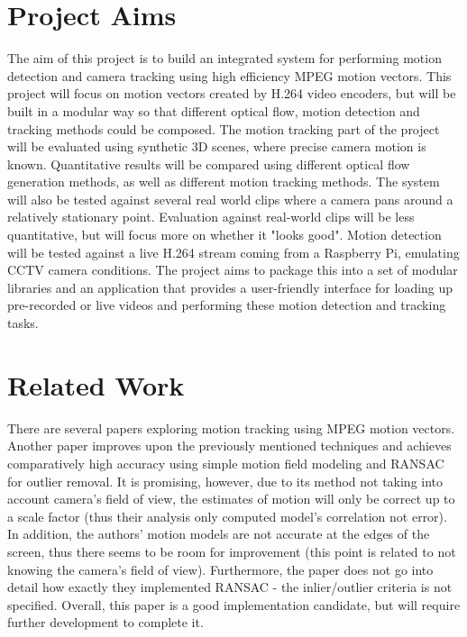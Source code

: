 \documentclass[11pt,english]{report}
\begin{document}
\section{Project Aims}

The aim of this project is to build an integrated system for performing motion detection and camera tracking using high efficiency MPEG motion vectors. This project will focus on motion vectors created by H.264 video encoders, but will be built in a modular way so that different optical flow, motion detection and tracking methods could be composed. The motion tracking part of the project will be evaluated using synthetic 3D scenes, where precise camera motion is known. Quantitative results will be compared using different optical flow generation methods, as well as different motion tracking methods. The system will also be tested against several real world clips where a camera pans around a relatively stationary point. Evaluation against real-world clips will be less quantitative, but will focus more on whether it "looks good". Motion detection will be tested against a live H.264 stream coming from a Raspberry Pi, emulating CCTV camera conditions. The project aims to package this into a set of modular libraries and an application that provides a user-friendly interface for loading up pre-recorded or live videos and performing these motion detection and tracking tasks.

\section{Related Work}

There are several papers exploring motion tracking using MPEG motion vectors\cite{1334181}\cite{1414440}\cite{825867}. Another paper improves upon the previously mentioned techniques and achieves comparatively high accuracy using simple motion field modeling and RANSAC for outlier removal\cite{almeida}. It is promising, however, due to its method not taking into account camera's field of view, the estimates of motion will only be correct up to a scale factor (thus their analysis only computed model's correlation not error). In addition, the authors' motion models are not accurate at the edges of the screen, thus there seems to be room for improvement (this point is related to not knowing the camera's field of view). Furthermore, the paper does not go into detail how exactly they implemented RANSAC - the inlier/outlier criteria is not specified. Overall, this paper is a good implementation candidate, but will require further development to complete it.
\end{document}
